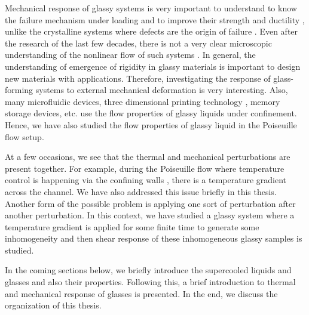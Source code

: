 Mechanical response of glassy systems is very important to understand to know the failure mechanism under loading and to improve their strength and ductility \cite{schroers2004ductile}, unlike the crystalline systems where defects are the origin of failure \cite{smith1967crack}. Even after the research of the last few decades, there is not a very clear microscopic understanding of the nonlinear flow of such systems \cite{ludovicRMP2017,nicolas2018deformation}. In general, the understanding of emergence of rigidity in glassy materials is important to design new materials with applications. Therefore, investigating the response of glass-forming systems to external mechanical deformation is very interesting. Also, many microfluidic devices, three dimensional printing technology \cite{marchelli2011guide}, memory storage devices, etc. use the flow properties of glassy liquids under confinement. Hence, we have also studied the flow properties of glassy liquid in the Poiseuille flow setup.

At a few occasions, we see that the thermal and mechanical perturbations are present together. For example, during the Poiseuille flow where temperature control is happening via the confining walls \cite{evansMorrissBook}, there is a temperature gradient across the channel. We have also addressed this issue briefly in this thesis. Another form of the possible problem is applying one sort of perturbation after another perturbation. In this context, we have studied a glassy system where a temperature gradient is applied for some finite time to generate some inhomogeneity and then shear response of these inhomogeneous glassy samples is studied.

In the coming sections below, we briefly introduce the supercooled liquids and glasses and also their properties. Following this, a brief introduction to thermal and mechanical response of glasses is presented. In the end, we discuss the organization of this thesis.

